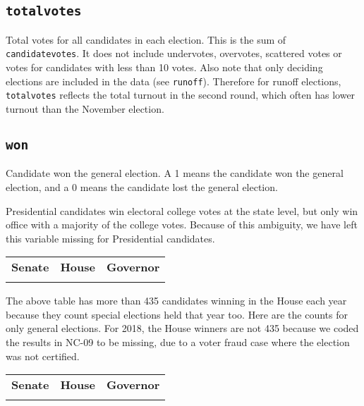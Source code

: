 \documentclass[12pt]{article}
\begin{document}
\begin{table}[!h]
\centering
\footnotesize

\end{table}


\FloatBarrier

\subsection*{\texttt{totalvotes}}

Total votes for all candidates in each election. This is the sum of \texttt{candidatevotes}. It does not include undervotes, overvotes, scattered votes or votes for candidates with less than 10 votes.  Also note that only deciding elections are included in the data (see \texttt{runoff}). Therefore for runoff elections, \texttt{totalvotes} reflects the total turnout in the second round, which often has lower turnout than the November election.



\subsection*{\texttt{won}}
Candidate won the general election. A 1 means the candidate won the general election, and a 0 means the candidate lost the general election.

Presidential candidates win electoral college votes at the state level, but only win office with a majority of the college votes. Because of this ambiguity, we have left this variable missing for Presidential candidates.

    \begin{tabularx}{\linewidth}{CCC}
    \textbf{Senate} & \textbf{House} & \textbf{Governor}\\
     &  & 
    \end{tabularx}

The above table has more than 435 candidates winning in the House each year because they count special elections held that year too. Here are the counts for only general elections. For 2018, the House winners are not 435 because we coded the results in NC-09 to be missing, due to a voter fraud case where the election was not certified.

\begin{tabularx}{\linewidth}{CCC}
    \textbf{Senate} & \textbf{House} & \textbf{Governor}\\
     &  & 
    \end{tabularx}
\end{document}
